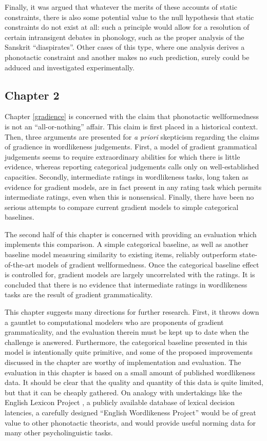 Finally, it was argued that whatever the merits of these accounts of static constraints, there is also some potential value to the null hypothesis that static constraints do not exist at all: such a principle would allow for a resolution of certain intransigent debates in phonology, such as the proper analysis of the Sanskrit ``diaspirates''.
Other cases of this type, where one analysis derives a phonotactic constraint and another makes no such prediction, surely could be adduced and investigated experimentally.

\subsection{Chapter 2}

Chapter \ref{gradience} is concerned with the claim that phonotactic wellformedness is not an ``all-or-nothing'' affair.
This claim is first placed in a historical context.
Then, three arguments are presented for \emph{a priori} skepticism regarding the claims of gradience in wordlikeness judgements.
First, a model of gradient grammatical judgements seems to require extraordinary abilities for which there is little evidence, whereas reporting categorical judgements calls only on well-established capacities.
Secondly, intermediate ratings in wordlikeness tasks, long taken as evidence for gradient models, are in fact present in any rating task which permits intermediate ratings, even when this is nonsensical.
Finally, there have been no serious attempts to compare current gradient models to simple categorical baselines.

The second half of this chapter is concerned with providing an evaluation which implements this comparison.
A simple categorical baseline, as well as another baseline model measuring similarity to existing items, reliably outperform state-of-the-art models of gradient wellformedness.
Once the categorical baseline effect is controlled for, gradient models are largely uncorrelated with the ratings.
It is concluded that there is no evidence that intermediate ratings in wordlikeness tasks are the result of gradient grammaticality.

This chapter suggests many directions for further research.
First, it throws down a gauntlet to computational modelers who are proponents of gradient grammaticality, and the evaluation therein must be kept up to date when the challenge is answered.
Furthermore, the categorical baseline presented in this model is intentionally quite primitive, and some of the proposed improvements discussed in the chapter are worthy of implementation and evaluation.
The evaluation in this chapter is based on a small amount of published wordlikeness data. 
It should be clear that the quality and quantity of this data is quite limited, but that it can be cheaply gathered.
On analogy with undertakings like the English Lexicon Project \citep{ELP}, a publicly available database of lexical decision latencies, a carefully designed ``English Wordlikeness Project'' would be of great value to other phonotactic theorists, and would provide useful norming data for many other psycholinguistic tasks.


